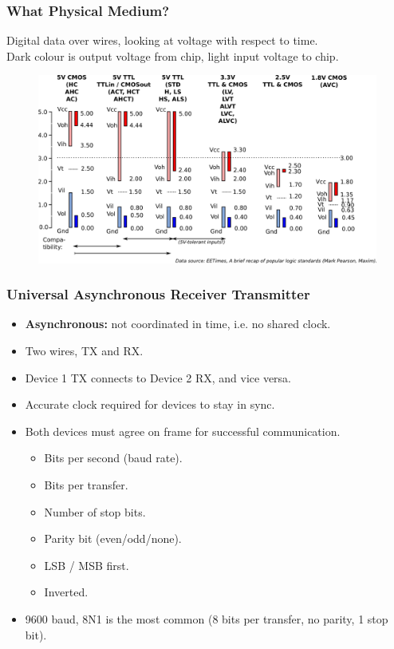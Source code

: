 \documentclass[t]{beamer}
\begin{document}
\begin{frame}[t]
\frametitle{What Physical Medium?}
Digital data over wires, looking at voltage with respect to time. \\
Dark colour is output voltage from chip, light input voltage to chip.
\begin{figure}
	\includegraphics[width=0.8\linewidth]{logicLevels.png}
\end{figure}

\end{frame}


\begin{frame}[t]
\frametitle{Universal Asynchronous Receiver Transmitter}
\begin{itemize}
	\item \textbf{Asynchronous: }not coordinated in time, i.e. no shared clock.\\
	\item Two wires, TX and RX.\\
	\item Device 1 TX connects to Device 2 RX, and vice versa. 
	\item Accurate clock required for devices to stay in sync.
	\item Both devices must agree on frame for successful communication.
	\begin{itemize}
		\item Bits per second (baud rate).
		\item Bits per transfer.
		\item Number of stop bits.
		\item Parity bit (even/odd/none).
		\item LSB / MSB first.
		\item Inverted. 
	\end{itemize}
	\item 9600 baud, 8N1 is the most common (8 bits per transfer, no parity, 1 stop bit). 
\end{itemize}

\end{frame}
\end{document}
